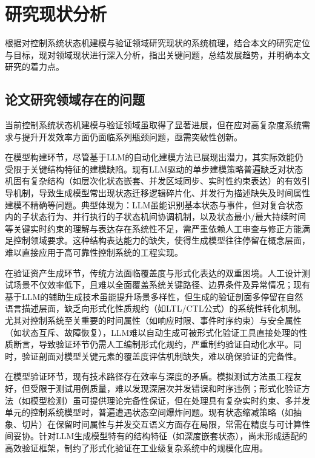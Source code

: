 \section{研究现状分析}
\label{section-analysis}

根据对控制系统状态机建模与验证领域研究现状的系统梳理，结合本文的研究定位与目标，现对领域现状进行深入分析，指出关键问题，总结发展趋势，并明确本文研究的着力点。

\subsection{论文研究领域存在的问题}
\label{section-analysis-problem}

当前控制系统状态机建模与验证领域虽取得了显著进展，但在应对高复杂度系统需求与提升开发效率方面仍面临系列瓶颈问题，亟需突破性创新。

在模型构建环节，尽管基于LLM的自动化建模方法已展现出潜力，其实际效能仍受限于关键结构特征的建模缺陷。现有LLM驱动的单步建模策略普遍缺乏对状态机固有复杂结构（如层次化状态嵌套、并发区域同步、实时性约束表达）的有效引导机制，导致生成模型常出现状态迁移逻辑碎片化、并发行为描述缺失及时间属性建模不精确等问题。典型体现为：LLM虽能识别基本状态与事件，但对复合状态内的子状态行为、并行执行的子状态机间协调机制，以及状态最小/最大持续时间等关键实时约束的理解与表达存在系统性不足，需严重依赖人工审查与修正方能满足控制领域要求。这种结构表达能力的缺失，使得生成模型往往停留在概念层面，难以直接应用于高可靠性控制系统的工程实现。

在验证资产生成环节，传统方法面临覆盖度与形式化表达的双重困境。人工设计测试场景不仅效率低下，且难以全面覆盖系统关键路径、边界条件及异常情况；现有基于LLM的辅助生成技术虽能提升场景多样性，但生成的验证剖面多停留在自然语言描述层面，缺乏向形式化性质规约（如LTL/CTL公式）的系统性转化机制。尤其对控制系统至关重要的时间属性（如响应时限、事件时序约束）与安全属性（如状态互斥、故障恢复），LLM难以自动生成可被形式化验证工具直接处理的性质断言，导致验证环节仍需人工编制形式化规约，严重制约验证自动化水平。同时，验证剖面对模型关键元素的覆盖度评估机制缺失，难以确保验证的完备性。

在模型验证环节，现有技术路径存在效率与深度的矛盾。模拟测试方法虽工程友好，但受限于测试用例质量，难以发现深层次并发错误和时序违例；形式化验证方法（如模型检测）虽可提供理论完备性保证，但在处理具有复杂实时约束、多并发单元的控制系统模型时，普遍遭遇状态空间爆炸问题。现有状态缩减策略（如抽象、切片）在保留时间属性与并发交互语义方面存在局限，常需在精度与可计算性间妥协。针对LLM生成模型特有的结构特征（如深度嵌套状态），尚未形成适配的高效验证框架，制约了形式化验证在工业级复杂系统中的规模化应用。

